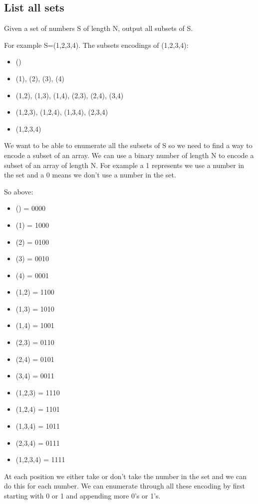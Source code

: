 \documentclass[11pt,oneside]{book}
\begin{document}
\subsection{List all sets}

Given a set of numbers S of length N, output all subsets of S.

For example S=(1,2,3,4). The subsets encodings of (1,2,3,4):

\begin{itemize}
\item ()
\item (1), (2), (3), (4)
\item (1,2), (1,3), (1,4), (2,3), (2,4), (3,4)
\item (1,2,3), (1,2,4), (1,3,4), (2,3,4)
\item (1,2,3,4)
\end{itemize}

We want to be able to enumerate all the subsets of S so we need to find a way to encode a subset of an array. We can use a binary number of length N to encode a subset of an array of length N. For example a 1 represents we use a number in the set and a 0 means we don't use a number in the set.

So above:

\begin{itemize}
\item () = 0000
\item (1) = 1000
\item (2) = 0100
\item (3) = 0010
\item (4) = 0001
\item (1,2) = 1100
\item (1,3) = 1010
\item (1,4) = 1001
\item (2,3) = 0110
\item (2,4) = 0101
\item (3,4) = 0011
\item (1,2,3) = 1110
\item (1,2,4) = 1101
\item (1,3,4) = 1011
\item (2,3,4) = 0111
\item (1,2,3,4) = 1111
\end{itemize}

At each position we either take or don't take the number in the set and we can do this for each number. We can enumerate through all these encoding by first starting with 0 or 1 and appending more 0's or 1's.
\end{document}

